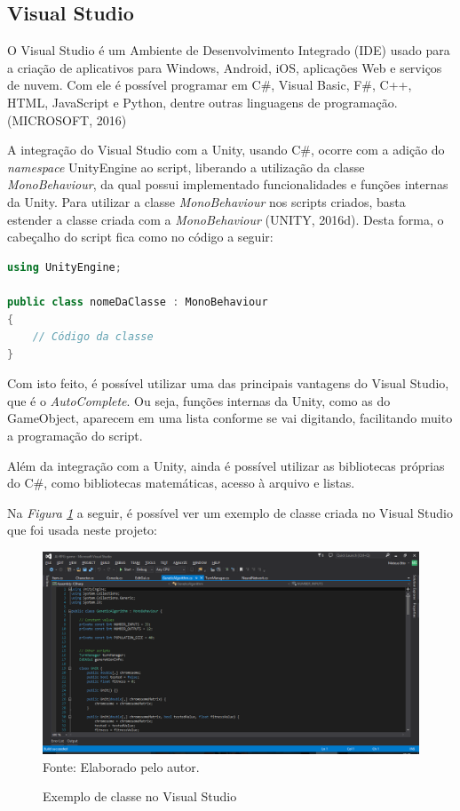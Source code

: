 \documentclass[12pt,a4paper]{article}
\newcommand{\source}[1]{\small Fonte: {#1}}
\begin{document}
	\FloatBarrier
	\subsection{Visual Studio}
		O Visual Studio é um Ambiente de Desenvolvimento Integrado (IDE) usado para a criação de aplicativos para Windows, Android, iOS, aplicações Web e serviços de nuvem.
		Com ele é possível programar em C\#, Visual Basic, F\#, C++, HTML, JavaScript e Python, dentre outras linguagens de programação. (MICROSOFT, 2016)
		
		A integração do Visual Studio com a Unity, usando C\#, ocorre com a adição do \textit{namespace} UnityEngine ao script,
		liberando a utilização da classe \textit{MonoBehaviour},
		da qual possui implementado funcionalidades e funções internas da Unity.
		Para utilizar a classe \textit{MonoBehaviour} nos scripts criados,
		basta estender a classe criada com a \textit{MonoBehaviour} (UNITY, 2016d).
		Desta forma, o cabeçalho do script fica como no código a seguir:
		
		\begin{lstlisting}[language=C++]
using UnityEngine;

public class nomeDaClasse : MonoBehaviour
{
	// Código da classe
}\end{lstlisting}
		
		Com isto feito, é possível utilizar uma das principais vantagens do Visual Studio,
		que é o \textit{AutoComplete}.
		Ou seja, funções internas da Unity, como as do GameObject, aparecem em uma lista conforme se vai digitando,
		facilitando muito a programação do script.
		
		Além da integração com a Unity,
		ainda é possível utilizar as bibliotecas próprias do C\#,
		como bibliotecas matemáticas, acesso à arquivo e listas.
		
		Na \textit{Figura \ref{fig:exvs}} a seguir, é possível ver um exemplo de classe criada no Visual Studio que foi usada neste projeto:
		
		\begin{figure}[ht!]
			\caption{Exemplo de classe no Visual Studio}
			\centering
			\includegraphics[scale=0.4]{InterfaceVisualStudio.png}\\
			\vspace{0.5mm}
			\source{Elaborado pelo autor.}
			\label{fig:exvs}
		\end{figure}
		
\end{document}
